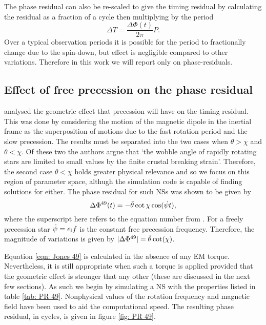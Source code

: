 \documentclass[../full_thesis/full_thesis.tex]{subfiles}
\begin{document}
The phase residual can also be re-scaled to give the timing residual by
calculating the residual as a fraction of a cycle then multiplying by the
period
\begin{equation}
    \Delta T = \frac{\Delta\Phi(t)}{2\pi} P.
    \label{eqn: phase to timing}
\end{equation}
Over a typical observation periods it is possible for the period to
fractionally change due to the spin-down, but effect is negligible compared to
other variations. Therefore in this work we will report only on
phase-residuals.

\subsection{Effect of free precession on the phase residual}

\citet{Jones2001} analysed the geometric effect that precession will have on
the timing residual. This was done by considering the motion of the magnetic
dipole in the inertial frame as the superposition of motions due to the fast
rotation period and the slow precession. The results must be separated into the
two cases when $\theta > \chi$ and $\theta < \chi$. Of these two the authors
argue that `the wobble angle  of rapidly rotating stars are limited to small
values by the finite crustal breaking strain'. Therefore, the second case
$\theta < \chi$ holds greater physical relevance and so we focus on this region
of parameter space, althugh the simulation code is capable of finding solutions
for either. The phase residual for such NSs was shown to be given by
\begin{equation}
    \Delta\Phi^{49}(t) = -\tilde{\theta} \cot\chi\cos(\dot{\psi t}),
    \label{eqn: Jones 49}
\end{equation}
where the superscript here refers to the equation number from \citet{Jones2001}.
For a freely precession star $\dot{\psi}=\epsilon_{\mathrm{I}} f$ is the constant free
precession frequency. Therefore, the magnitude of variations is given by
$|\Delta\Phi^{49}|=\tilde{\theta} \cot(\chi)$.

Equation \eqref{eqn: Jones 49} is calculated in the absence of any EM torque.
Nevertheless, it is still appropriate when such a torque is applied provided
that the geometric effect is stronger that any other (these are discussed in
the next few sections). As such we begin by simulating a NS with the properties
listed in table \ref{tab: PR 49}. Nonphysical values of the
rotation frequency and magnetic field have been used to aid the computational
speed. The resulting phase residual, in cycles, is given in figure \ref{fig:
PR 49}.
\end{document}
